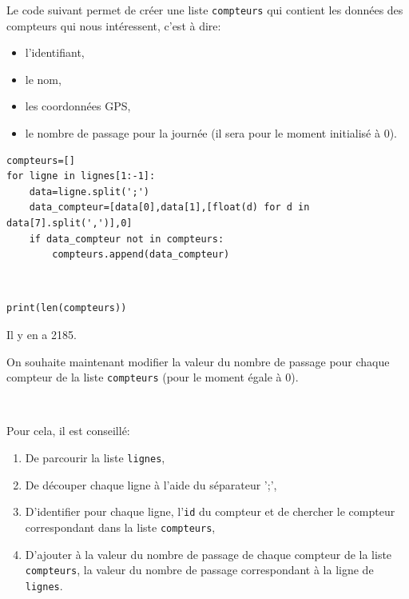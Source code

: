 Le code suivant permet de créer une liste \verb?compteurs? qui contient les données des compteurs qui nous intéressent, c'est à dire:
\begin{itemize}
 \item l'identifiant,
 \item le nom,
 \item les coordonnées GPS,
 \item le nombre de passage pour la journée (il sera pour le moment initialisé à 0).
\end{itemize}

\begin{verbatim}
compteurs=[]
for ligne in lignes[1:-1]:
    data=ligne.split(';')
    data_compteur=[data[0],data[1],[float(d) for d in data[7].split(',')],0]
    if data_compteur not in compteurs:
        compteurs.append(data_compteur)
\end{verbatim}


\begin{solution}~\ \\
\begin{verbatim}
print(len(compteurs))
\end{verbatim}
Il y en a 2185.
\end{solution}

On souhaite maintenant modifier la valeur du nombre de passage pour chaque compteur de la liste \verb?compteurs? (pour le moment égale à 0).

~\

Pour cela, il est conseillé:
\begin{enumerate}
 \item De parcourir la liste \verb?lignes?,
 \item De découper chaque ligne à l'aide du séparateur ';',
 \item D'identifier pour chaque ligne, l'\verb?id? du compteur et de chercher le compteur correspondant dans la liste \verb?compteurs?,
 \item D'ajouter à la valeur du nombre de passage de chaque compteur de la liste \verb?compteurs?, la valeur du nombre de passage correspondant à la ligne de \verb?lignes?.
\end{enumerate}


